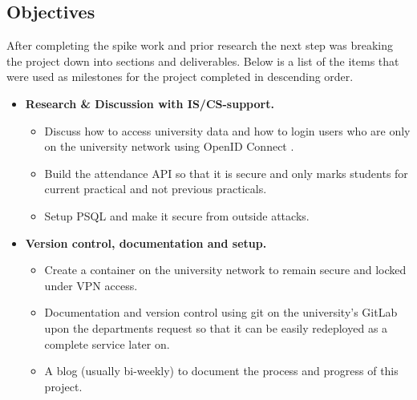 \subsection{Objectives}\label{sec1:obj}
After completing the spike work and prior research the next step was breaking the project down into sections and deliverables. Below is a list of the items that were used as milestones for the project completed in descending order.

\begin{itemize}
	\item \textbf{Research \& Discussion with IS/CS-support.}
	\begin{itemize}
		\item Discuss how to access university data and how to login users who are only on the university network using OpenID Connect \cite{OpenID}.
		\item Build the attendance API so that it is secure and only marks students for current practical and not previous practicals.
		\item Setup PSQL \cite{psql} and make it secure from outside attacks.
	\end{itemize}
	
	\item \textbf{Version control, documentation and setup.}
	\begin{itemize}
		\item Create a container on the university network to remain secure and locked under VPN access.
		\item Documentation and version control using git on the university's GitLab upon the departments request so that it can be easily redeployed as a complete service later on.
		\item A blog (usually bi-weekly) to document the process and progress of this project.
	\end{itemize}
	

\end{itemize}
